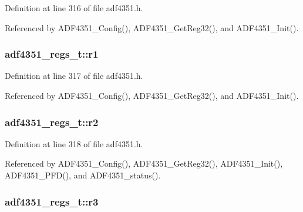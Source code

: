 Definition at line 316 of file adf4351.\+h.



Referenced by A\+D\+F4351\+\_\+\+Config(), A\+D\+F4351\+\_\+\+Get\+Reg32(), and A\+D\+F4351\+\_\+\+Init().

\subsubsection[{\texorpdfstring{r1}{r1}}]{ adf4351\+\_\+regs\+\_\+t\+::r1}\hypertarget{structadf4351__regs__t_a9e35aa252797cdae6d46ae0daad2bc40}{}\label{structadf4351__regs__t_a9e35aa252797cdae6d46ae0daad2bc40}


Definition at line 317 of file adf4351.\+h.



Referenced by A\+D\+F4351\+\_\+\+Config(), A\+D\+F4351\+\_\+\+Get\+Reg32(), and A\+D\+F4351\+\_\+\+Init().

\subsubsection[{\texorpdfstring{r2}{r2}}]{ adf4351\+\_\+regs\+\_\+t\+::r2}\hypertarget{structadf4351__regs__t_af6667dbbd7434e0394cc9f569d3e24bb}{}\label{structadf4351__regs__t_af6667dbbd7434e0394cc9f569d3e24bb}


Definition at line 318 of file adf4351.\+h.



Referenced by A\+D\+F4351\+\_\+\+Config(), A\+D\+F4351\+\_\+\+Get\+Reg32(), A\+D\+F4351\+\_\+\+Init(), A\+D\+F4351\+\_\+\+P\+F\+D(), and A\+D\+F4351\+\_\+status().

\subsubsection[{\texorpdfstring{r3}{r3}}]{ adf4351\+\_\+regs\+\_\+t\+::r3}\hypertarget{structadf4351__regs__t_a1aa968491b1182f3ae4f426ef5c1b83a}{}\label{structadf4351__regs__t_a1aa968491b1182f3ae4f426ef5c1b83a}


